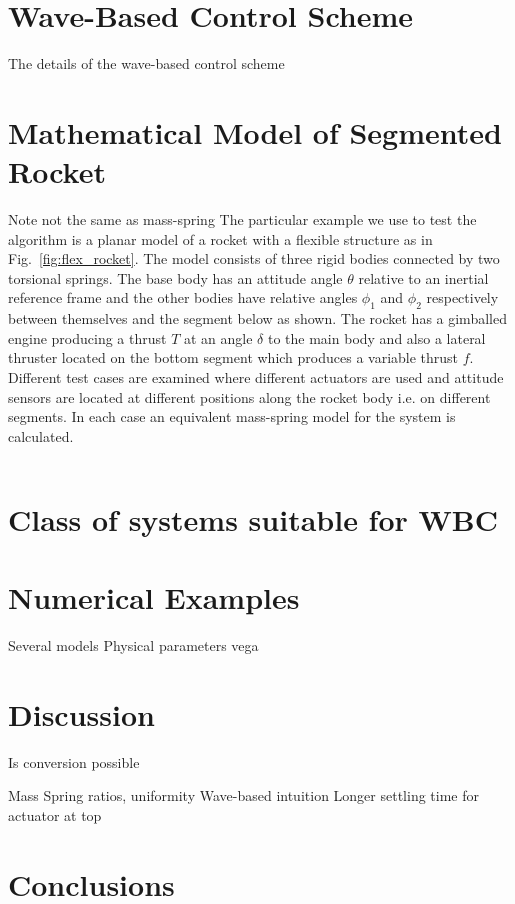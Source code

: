\documentclass{mbd_fullpaper}
\begin{document}
\section{Wave-Based Control Scheme}
The details of the wave-based control scheme

\section{Mathematical Model of Segmented Rocket}

Note not the same as mass-spring
The particular example we use to test the algorithm is a planar model of a rocket with a flexible structure as in Fig.~\ref{fig:flex_rocket}. The model consists of three rigid bodies connected by two torsional springs. The base body has an attitude angle $\theta$ relative to an inertial reference frame and the other bodies have relative angles $\phi_1$ and $\phi_2$ respectively between themselves and the segment below as shown. The rocket has a gimballed engine producing a thrust $T$ at an angle $\delta$ to the main body and also a lateral thruster located on the bottom segment which produces a variable thrust $f$. Different test cases are examined where different actuators are used and attitude sensors are located at different positions along the rocket body i.e. on different segments. In each case an equivalent mass-spring model for the system is calculated.

\begin{equation}

\end{equation}

\section{Class of systems suitable for WBC}

\section{Numerical Examples}
Several models
Physical parameters vega

\section{Discussion}
Is conversion possible

Mass Spring ratios, uniformity
Wave-based intuition
Longer settling time for actuator at top

\section{Conclusions}
\end{document}
